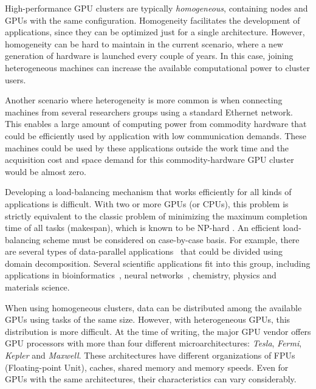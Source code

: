 \documentclass[journal]{IEEEtran}
\begin{document}
High-performance GPU clusters are typically \emph{homogeneous}, containing nodes
and GPUs with the same configuration. Homogeneity facilitates the development of
applications, since they can be optimized just for a single
architecture. %
However, homogeneity can be hard to maintain in the current scenario,
where a new generation of hardware is launched every couple of years. In
this case, joining heterogeneous machines can increase the available
computational power to cluster users.

Another scenario where heterogeneity is more common is when connecting machines
from several researchers groups using a standard Ethernet network. This enables
a large amount of computing power from commodity hardware that could be
efficiently used by application with low communication demands. These machines
could be used by these applications outside the work time and the acquisition
cost and space demand for this commodity-hardware GPU cluster would be almost
zero.

Developing a load-balancing mechanism that works efficiently for all kinds of
applications is difficult. With two or more GPUs (or CPUs), this problem is
strictly equivalent to the classic problem of minimizing the maximum completion
time of all tasks (makespan), which is known to be NP-hard \cite{GaJo1979}. An
efficient load-balancing scheme must be considered on case-by-case basis. For
example, there are several types of data-parallel
applications~\cite{Gropp:1992uq} that could be divided using domain
decomposition. Several scientific applications fit into this group, including
applications in bioinformatics~\cite{bioinformatica2}, neural
networks~\cite{neural}, chemistry, physics and materials science.

When using homogeneous clusters, data can be distributed among the available
GPUs using tasks of the same size. However, with heterogeneous GPUs, this
distribution is more difficult. At the time of writing, the major GPU vendor offers GPU processors with more than four different microarchitectures: \emph{Tesla},​ \emph{Fermi}, \emph{Kepler} and \emph{Maxwell}. These
architectures have different organizations of FPUs (Floating-point Unit),
caches, shared memory and memory speeds. Even for GPUs with the same
architectures, their characteristics can vary considerably.
\end{document}
